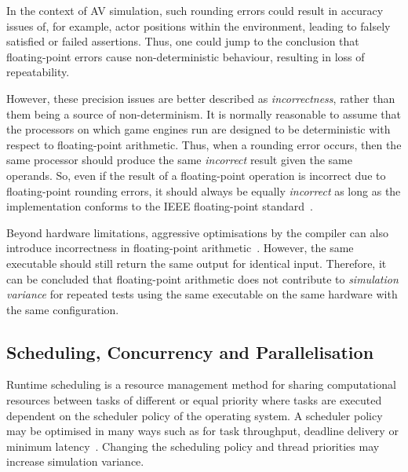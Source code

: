 \documentclass[letterpaper, 10 pt, journal, twoside]{IEEEtran}
\begin{document}
In the context of AV simulation, such rounding errors could result in accuracy issues of, for example, actor positions within the environment, leading to falsely satisfied or failed assertions.
%
Thus, one could jump to the conclusion that floating-point errors cause non-deterministic behaviour, resulting in loss of repeatability. 

However, these precision issues are better described as \textit{incorrectness}, rather than them being a source of non-determinism. 
%
It is normally reasonable to assume that the processors on which game engines run are designed to be deterministic with respect to floating-point arithmetic. 
%
Thus, when a rounding error occurs, then the same processor should produce the same \textit{incorrect} result given the same operands. 
%
So, even if the result of a floating-point operation is incorrect due to floating-point rounding errors, it should always 
be equally \textit{incorrect} as long as the implementation conforms to the IEEE floating-point standard~\cite{8766229}.

Beyond hardware limitations, aggressive optimisations by the compiler can also introduce incorrectness in floating-point arithmetic~\cite{llvm-floating-point}. However, the same executable should still return the same output for identical input. 
%
Therefore, it can be concluded that floating-point arithmetic does not contribute to \textit{simulation variance} for repeated tests using the same executable on the same hardware with the same configuration.

\subsection{Scheduling, Concurrency and Parallelisation}
Runtime scheduling is a resource management method for sharing computational resources between tasks of different or equal priority where tasks are executed dependent on the scheduler policy of the operating system. A scheduler policy may be optimised in many ways such as for task throughput, deadline delivery or minimum latency~\cite{liu1973scheduling}. 
%
Changing the scheduling policy and thread priorities may increase simulation variance. 
\end{document}
